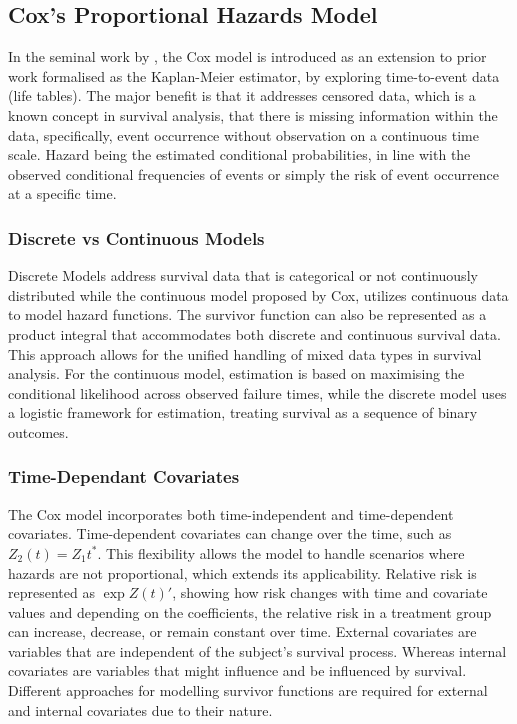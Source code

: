 \subsection{Cox's Proportional Hazards Model}

\noindent In the seminal work by \parencite{cox_regression_1972}, the Cox model is introduced as an extension to prior work formalised as the Kaplan-Meier estimator, by exploring time-to-event data (life tables). The major benefit is that it addresses censored data, which is a known concept in survival analysis, that there is missing information within the data, specifically, event occurrence without observation on a continuous time scale. Hazard being the estimated conditional probabilities, in line with the observed conditional frequencies of events or simply the risk of event occurrence at a specific time.  


\subsubsection{Discrete vs Continuous Models}
\noindent \parencite{kalbfleisch_fifty_2023} Discrete Models address survival data that is categorical or not continuously distributed while the continuous model proposed by Cox, utilizes continuous data to model hazard functions. The survivor function can also be represented as a product integral that accommodates both discrete and continuous survival data. This approach allows for the unified handling of mixed data types in survival analysis. For the continuous model, estimation is based on maximising the conditional likelihood across observed failure times, while the discrete model uses a logistic framework for estimation, treating survival as a sequence of binary outcomes.

\subsubsection{Time-Dependant Covariates}
\noindent The Cox model incorporates both time-independent and time-dependent covariates. \parencite{kalbfleisch_fifty_2023} Time-dependent covariates can change over the time, such as \(Z_{2}(t) = Z_{1}t^{*}\). This flexibility allows the model to handle scenarios where hazards are not proportional, which extends its applicability. Relative risk is represented as \(\exp{Z(t)'}\), showing how risk changes with time and covariate values and depending on the coefficients, the relative risk in a treatment group can increase, decrease, or remain constant over time. \parencite{kalbfleisch_fifty_2023} External covariates are variables that are independent of the subject's survival process. Whereas internal covariates are variables that might influence and be influenced by survival. \parencite{kalbfleisch_fifty_2023} Different approaches for modelling survivor functions are required for external and internal covariates due to their nature.

